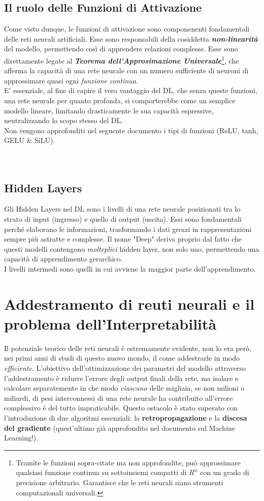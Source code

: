 \documentclass{article}
\begin{document}
\subsection{Il ruolo delle Funzioni di Attivazione}
Come visto dunque, le funzioni di attivazione sono componenenti fondamentali delle reti neurali artificiali. Esse sono responsabili della cosiddetta \textbf{\textit{non-linearità}} del modello, permettendo così di apprendere relazioni complesse. Esse sono direttamente legate al \textit{\textbf{Teorema dell'Approsimazione Universale}}\footnote{Tramite le funzioni sopra-citate ma non approfondite, può approssimare qualsiasi funzione continua su sottoinsiemi compatti di $R^n$ con un grado di precisione arbitrario. Garantisce che le reti neurali siano strumenti computazionali universali.}, che afferma la capacità di una rete neurale con un numero sufficiente di neuroni di approssimare quasi ogni \textit{funzione continua}.
\\
E' essenziale, al fine di capire il vero vantaggio del DL, che senza queste funzioni, una rete neurale per quanto profonda, si comporterebbe come un semplice modello lineare, limitando drasticamente le sua capacità espressive, neutralizzando lo scopo stesso del DL.
\\
Non vengono approfonditi nel seguente documento i tipi di funzioni (ReLU, tanh, GELU \& SiLU).
\\
\\
\\
\subsection{Hidden Layers}
Gli Hidden Layers nel DL sono i livelli di una rete neurale posizionati tra lo strato di input (ingresso) e quello di output (uscita). Essi sono fondamentali perché elaborano le informazioni, trasformando i dati grezzi in rappresentazioni sempre più astratte e complesse. Il nome "Deep" deriva proprio dal fatto che questi modelli contengono \textit{molteplici} hidden layer, non solo uno, permettendo una capacità di apprendimento gerarchico.
\\
I livelli intermedi sono quelli in cui avviene la maggior parte dell'apprendimento.

\section{Addestramento di reuti neurali e il problema dell'Interpretabilità}
Il potenziale teorico delle reti neurali è estremamente evidente, non lo era però, nei primi anni di studi di questo nuovo mondo, il come addestrarle in modo \textit{efficiente}. L'obiettivo dell'ottimizzazione dei parametri del modello attraverso l'addestramento è ridurre l'errore degli output finali della rete, ma isolare e calcolare separatemente in che modo \textit{ciascuno} delle migliaia, se non milioni o miliardi, di pesi interconnessi di una rete neurale ha contribuito all'errore complessivo è del tutto impraticabile. Questo ostacolo è stato superato con l'introduzione di due algoritmi essenziali: la \textbf{retropropagazione} e la \textbf{discesa del gradiente} (quest'ultimo già approfondito nel documento sul Machine Learning!).
\end{document}

